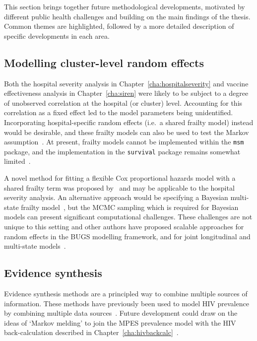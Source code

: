 This section brings together future methodological developments, motivated by different public health challenges and building on the main findings of the thesis. Common themes are highlighted, followed by a more detailed description of specific developments in each area.

\subsection{Modelling cluster-level random effects}

Both the hospital severity analysis in Chapter~\ref{cha:hospitalseverity} and vaccine effectiveness analysis in Chapter~\ref{cha:siren} were likely to be subject to a degree of unobserved correlation at the hospital (or cluster) level. Accounting for this correlation as a fixed effect led to the model parameters being unidentified. Incorporating hospital-specific random effects (i.e.\ a shared frailty model) instead would be desirable, and these frailty models can also be used to test the Markov assumption~\parencite{Titman2022-jt}. At present, frailty models cannot be implemented within the \texttt{msm} package, and the implementation in the \texttt{survival} package remains somewhat limited~\parencite{Jackson2021-ij, Therneau1999-to}.

A novel method for fitting a flexible Cox proportional hazards model with a shared frailty term was proposed by~\cite{Gasperoni2020-cx} and may be applicable to the hospital severity analysis. An alternative approach would be specifying a Bayesian multi-state frailty model~\parencite{van-den-Hout2016-xy}, but the MCMC sampling which is required for Bayesian models can present significant computational challenges. These challenges are not unique to this setting and other authors have proposed scalable approaches for random effects in the BUGS modelling framework, and for joint longitudinal and multi-state models~\parencite{Chen2023-fo, Goudie2020-ra}.

\subsection{Evidence synthesis}

Evidence synthesis methods are a principled way to combine multiple sources of information. These methods have previously been used to model HIV prevalence by combining multiple data sources~\parencite{Presanis2011-uy, Welton2005-zf}. Future development could draw on the ideas of `Markov melding' to join the MPES prevalence model with the HIV back-calculation described in Chapter~\ref{cha:hivbackcalc}~\parencite{Goudie2019-pe}.

